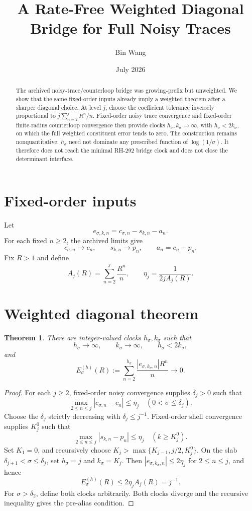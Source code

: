 \documentclass[11pt]{article}
\title{A Rate-Free Weighted Diagonal Bridge for Full Noisy Traces}
\author{Bin Wang}\date{July 2026}
\newtheorem{theorem}{Theorem}[section]
\theoremstyle{remark}\newtheorem{remark}[theorem]{Remark}
\begin{document}
\maketitle
\begin{abstract}
The archived noisy-trace/counterloop bridge was growing-prefix but
unweighted.  We show that the same fixed-order inputs already imply a
weighted theorem after a sharper diagonal choice.  At level $j$, choose the
coefficient tolerance inversely proportional to
$j\sum_{n=2}^jR^n/n$.  Fixed-order noisy trace convergence and fixed-order
finite-radius counterloop convergence then provide clocks
$h_\sigma,k_\sigma\to\infty$, with $h_\sigma<2k_\sigma$, on which the full
weighted constituent error tends to zero.  The construction remains
nonquantitative: $h_\sigma$ need not dominate any prescribed function of
$\log(1/\sigma)$.  It therefore does not reach the minimal RH-292 bridge
clock and does not close the determinant interface.
\end{abstract}

\section{Fixed-order inputs}
Let
\[
 e_{\sigma,k,n}=c_{\sigma,n}-s_{k,n}-a_n.
\]
For each fixed $n\ge2$, the archived limits give
\[
 c_{\sigma,n}\to c_n,\qquad s_{k,n}\to p_n,\qquad a_n=c_n-p_n.
\]
Fix $R>1$ and define
\[
 A_j(R)=\sum_{n=2}^j\frac{R^n}{n},\qquad
 \eta_j=\frac1{2jA_j(R)}.
\]

\section{Weighted diagonal theorem}
\begin{theorem}\label{thm:weighted}
There are integer-valued clocks $h_\sigma,k_\sigma$ such that
\[
 h_\sigma\to\infty,\qquad k_\sigma\to\infty,\qquad
 h_\sigma<2k_\sigma,
\]
and
\[
 E_\sigma^{(h)}(R):=
 \sum_{n=2}^{h_\sigma}
 \frac{|e_{\sigma,k_\sigma,n}|R^n}{n}\longrightarrow0.
\]
\end{theorem}
\begin{proof}
For each $j\ge2$, fixed-order noisy convergence supplies $\delta_j>0$ such
that
\[
 \max_{2\le n\le j}|c_{\sigma,n}-c_n|\le\eta_j
 \quad(0<\sigma\le\delta_j).
\]
Choose the $\delta_j$ strictly decreasing with $\delta_j\le j^{-1}$.
Fixed-order shell convergence
supplies $K_j^0$ such that
\[
 \max_{2\le n\le j}|s_{k,n}-p_n|\le\eta_j
 \quad(k\ge K_j^0).
\]
Set $K_1=0$, and recursively choose
$K_j>\max\{K_{j-1},j/2,K_j^0\}$.  On the slab
$\delta_{j+1}<\sigma\le\delta_j$, set
$h_\sigma=j$ and $k_\sigma=K_j$.  Then
$|e_{\sigma,k_\sigma,n}|\le2\eta_j$ for $2\le n\le j$, and hence
\[
 E_\sigma^{(h)}(R)\le2\eta_jA_j(R)=j^{-1}.
\]
For $\sigma>\delta_2$, define both clocks arbitrarily.
Both clocks diverge and the recursive inequality gives the pre-alias
condition.
\end{proof}
\end{document}
